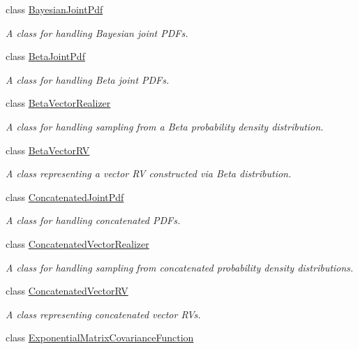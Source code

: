 \begin{DoxyCompactItemize}
class \hyperlink{class_q_u_e_s_o_1_1_bayesian_joint_pdf}{Bayesian\-Joint\-Pdf}
\begin{DoxyCompactList}\small\item\em A class for handling Bayesian joint P\-D\-Fs. \end{DoxyCompactList}\item 
class \hyperlink{class_q_u_e_s_o_1_1_beta_joint_pdf}{Beta\-Joint\-Pdf}
\begin{DoxyCompactList}\small\item\em A class for handling Beta joint P\-D\-Fs. \end{DoxyCompactList}\item 
class \hyperlink{class_q_u_e_s_o_1_1_beta_vector_realizer}{Beta\-Vector\-Realizer}
\begin{DoxyCompactList}\small\item\em A class for handling sampling from a Beta probability density distribution. \end{DoxyCompactList}\item 
class \hyperlink{class_q_u_e_s_o_1_1_beta_vector_r_v}{Beta\-Vector\-R\-V}
\begin{DoxyCompactList}\small\item\em A class representing a vector R\-V constructed via Beta distribution. \end{DoxyCompactList}\item 
class \hyperlink{class_q_u_e_s_o_1_1_concatenated_joint_pdf}{Concatenated\-Joint\-Pdf}
\begin{DoxyCompactList}\small\item\em A class for handling concatenated P\-D\-Fs. \end{DoxyCompactList}\item 
class \hyperlink{class_q_u_e_s_o_1_1_concatenated_vector_realizer}{Concatenated\-Vector\-Realizer}
\begin{DoxyCompactList}\small\item\em A class for handling sampling from concatenated probability density distributions. \end{DoxyCompactList}\item 
class \hyperlink{class_q_u_e_s_o_1_1_concatenated_vector_r_v}{Concatenated\-Vector\-R\-V}
\begin{DoxyCompactList}\small\item\em A class representing concatenated vector R\-Vs. \end{DoxyCompactList}\item 
class \hyperlink{class_q_u_e_s_o_1_1_exponential_matrix_covariance_function}{Exponential\-Matrix\-Covariance\-Function}

\end{DoxyCompactItemize}
